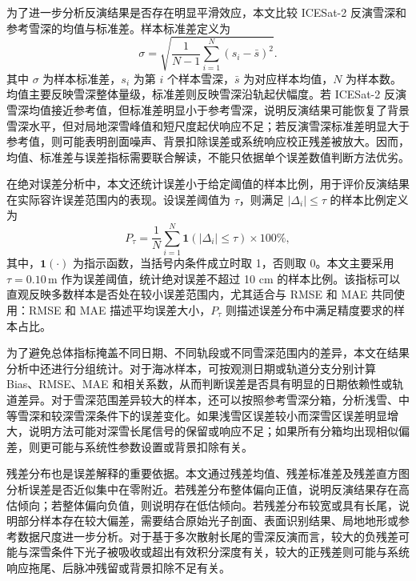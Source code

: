 为了进一步分析反演结果是否存在明显平滑效应，本文比较 ICESat-2 反演雪深和参考雪深的均值与标准差。样本标准差定义为
\begin{equation}
    \sigma
    =
    \sqrt{
    \frac{1}{N-1}
    \sum_{i=1}^{N}
    \left(s_i-\bar{s}\right)^2
    }.
\end{equation}
其中 \(\sigma\) 为样本标准差，\(s_i\) 为第 \(i\) 个样本雪深，\(\bar{s}\) 为对应样本均值，\(N\) 为样本数。均值主要反映雪深整体量级，标准差则反映雪深沿轨起伏幅度。若 ICESat-2 反演雪深均值接近参考值，但标准差明显小于参考雪深，说明反演结果可能恢复了背景雪深水平，但对局地深雪峰值和短尺度起伏响应不足；若反演雪深标准差明显大于参考值，则可能表明剖面噪声、背景扣除误差或系统响应校正残差被放大。因而，均值、标准差与误差指标需要联合解读，不能只依据单个误差数值判断方法优劣。

在绝对误差分析中，本文还统计误差小于给定阈值的样本比例，用于评价反演结果在实际容许误差范围内的表现。设误差阈值为 \(\tau\)，则满足 \(|\Delta_i|\leq \tau\) 的样本比例定义为
\begin{equation}
    P_{\tau}
    =
    \frac{1}{N}
    \sum_{i=1}^{N}
    \mathbf{1}
    \left(
    |\Delta_i|\leq \tau
    \right)
    \times 100\%,
\end{equation}
其中，\(\mathbf{1}(\cdot)\) 为指示函数，当括号内条件成立时取 1，否则取 0。本文主要采用 \(\tau=0.10\,\mathrm{m}\) 作为误差阈值，统计绝对误差不超过 10 cm 的样本比例。该指标可以直观反映多数样本是否处在较小误差范围内，尤其适合与 RMSE 和 MAE 共同使用：RMSE 和 MAE 描述平均误差大小，\(P_{\tau}\) 则描述误差分布中满足精度要求的样本占比。

为了避免总体指标掩盖不同日期、不同轨段或不同雪深范围内的差异，本文在结果分析中还进行分组统计。对于海冰样本，可按观测日期或轨道分支分别计算 Bias、RMSE、MAE 和相关系数，从而判断误差是否具有明显的日期依赖性或轨道差异。对于雪深范围差异较大的样本，还可以按照参考雪深分箱，分析浅雪、中等雪深和较深雪深条件下的误差变化。如果浅雪区误差较小而深雪区误差明显增大，说明方法可能对深雪长尾信号的保留或响应不足；如果所有分箱均出现相似偏差，则更可能与系统性参数设置或背景扣除有关。

残差分布也是误差解释的重要依据。本文通过残差均值、残差标准差及残差直方图分析误差是否近似集中在零附近。若残差分布整体偏向正值，说明反演结果存在高估倾向；若整体偏向负值，则说明存在低估倾向。若残差分布较宽或具有长尾，说明部分样本存在较大偏差，需要结合原始光子剖面、表面识别结果、局地地形或参考数据尺度进一步分析。对于基于多次散射长尾的雪深反演而言，较大的负残差可能与深雪条件下光子被吸收或超出有效积分深度有关，较大的正残差则可能与系统响应拖尾、后脉冲残留或背景扣除不足有关。

